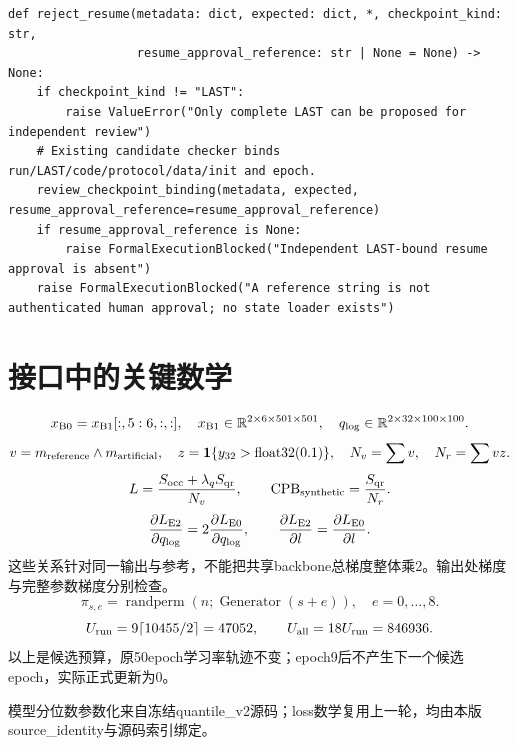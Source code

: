 \documentclass[UTF8,fontset=fandol,10pt]{ctexart}
\begin{document}
\begin{lstlisting}
def reject_resume(metadata: dict, expected: dict, *, checkpoint_kind: str,
                  resume_approval_reference: str | None = None) -> None:
    if checkpoint_kind != "LAST":
        raise ValueError("Only complete LAST can be proposed for independent review")
    # Existing candidate checker binds run/LAST/code/protocol/data/init and epoch.
    review_checkpoint_binding(metadata, expected, resume_approval_reference=resume_approval_reference)
    if resume_approval_reference is None:
        raise FormalExecutionBlocked("Independent LAST-bound resume approval is absent")
    raise FormalExecutionBlocked("A reference string is not authenticated human approval; no state loader exists")
\end{lstlisting}
\clearpage\section{接口中的关键数学}
\[
 x_{\rm B0}=x_{\rm B1}[:,5:6,:,:],\quad
 x_{\rm B1}\in\mathbb R^{2\times6\times501\times501},\quad
 q_{\log}\in\mathbb R^{2\times32\times100\times100}.
\]
\[
 v=m_{\rm reference}\land m_{\rm artificial},\quad
 z=\mathbf1\{y_{32}>\mathrm{float32}(0.1)\},\quad N_v=\sum v,\quad N_r=\sum vz.
\]
\[
 L=\frac{S_{\rm occ}+\lambda_q S_{\rm qr}}{N_v},\qquad
 \mathrm{CPB}_{\rm synthetic}=\frac{S_{\rm qr}}{N_r}.
\]
\[
 \frac{\partial L_{\rm E2}}{\partial q_{\log}}=2\frac{\partial L_{\rm E0}}{\partial q_{\log}},
 \qquad \frac{\partial L_{\rm E2}}{\partial l}=\frac{\partial L_{\rm E0}}{\partial l}.
\]
这些关系针对同一输出与参考，不能把共享backbone总梯度整体乘2。输出处梯度与完整参数梯度分别检查。
\[
 \pi_{s,e}=\operatorname{randperm}(n;\operatorname{Generator}(s+e)),\quad e=0,\ldots,8.
\]
\[
 U_{\rm run}=9\lceil10455/2\rceil=47052,\qquad U_{\rm all}=18U_{\rm run}=846936.
\]
以上是候选预算，原50epoch学习率轨迹不变；epoch9后不产生下一个候选epoch，实际正式更新为0。

模型分位数参数化来自冻结quantile\_v2源码；loss数学复用上一轮，均由本版source\_identity与源码索引绑定。
\end{document}

